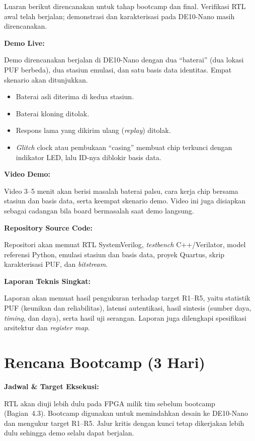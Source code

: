 \documentclass[11pt,a4paper]{article}
\newcommand{\field}[1]{\textbf{#1}\par\nobreak}
\begin{document}
Luaran berikut direncanakan untuk tahap bootcamp dan final. Verifikasi RTL awal telah berjalan; demonstrasi dan karakterisasi pada DE10-Nano masih direncanakan.

\field{Demo Live:}
Demo direncanakan berjalan di DE10-Nano dengan dua ``baterai'' (dua lokasi PUF berbeda), dua stasiun emulasi, dan satu basis data identitas. Empat skenario akan ditunjukkan.
\begin{itemize}
  \item Baterai asli diterima di kedua stasiun.
  \item Baterai kloning ditolak.
  \item Respons lama yang dikirim ulang (\emph{replay}) ditolak.
  \item \emph{Glitch} clock atau pembukaan ``casing'' membuat chip terkunci dengan indikator LED, lalu ID-nya diblokir basis data.
\end{itemize}

\field{Video Demo:}
Video 3--5 menit akan berisi masalah baterai palsu, cara kerja chip bersama stasiun dan basis data, serta keempat skenario demo. Video ini juga disiapkan sebagai cadangan bila board bermasalah saat demo langsung.

\field{Repository Source Code:}
Repositori akan memuat RTL SystemVerilog, \emph{testbench} C++/Verilator, model referensi Python, emulasi stasiun dan basis data, proyek Quartus, skrip karakterisasi PUF, dan \emph{bitstream}.

\field{Laporan Teknis Singkat:}
Laporan akan memuat hasil pengukuran terhadap target R1--R5, yaitu statistik PUF (keunikan dan reliabilitas), latensi autentikasi, hasil sintesis (sumber daya, \emph{timing}, dan daya), serta hasil uji serangan. Laporan juga dilengkapi spesifikasi arsitektur dan \emph{register map}.

\section*{Rencana Bootcamp (3 Hari)}

\field{Jadwal \& Target Eksekusi:} RTL akan diuji lebih dulu pada FPGA milik tim sebelum bootcamp (Bagian~4.3). Bootcamp digunakan untuk memindahkan desain ke DE10-Nano dan mengukur target R1--R5. Jalur kritis dengan kunci tetap dikerjakan lebih dulu sehingga demo selalu dapat berjalan.
\end{document}
